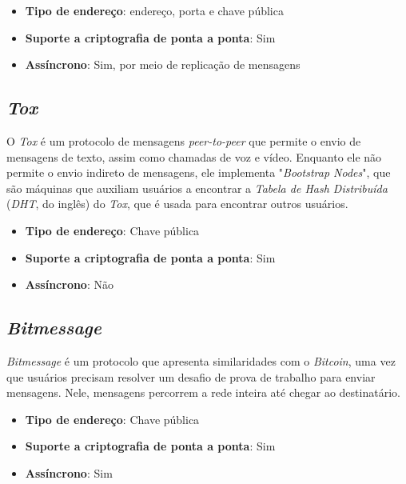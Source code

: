 \begin{itemize}
  \item \textbf{Tipo de endereço}: endereço, porta e chave pública
  \item \textbf{Suporte a criptografia de ponta a ponta}: Sim
  \item \textbf{Assíncrono}: Sim, por meio de replicação de mensagens
\end{itemize}

\subsection{\textit{Tox}}

O \textit{Tox} é um protocolo de mensagens \textit{peer-to-peer} que permite o envio de mensagens de texto, assim como chamadas de voz e vídeo. Enquanto ele não permite o envio indireto de mensagens, ele implementa "\textit{Bootstrap Nodes}", que são máquinas que auxiliam usuários a encontrar a \textit{Tabela de Hash Distribuída} (\textit{DHT}, do inglês) do \textit{Tox}, que é usada para encontrar outros usuários. \cite{toxcore}

\begin{itemize}
  \item \textbf{Tipo de endereço}: Chave pública
  \item \textbf{Suporte a criptografia de ponta a ponta}: Sim
  \item \textbf{Assíncrono}: Não
\end{itemize}

\subsection{\textit{Bitmessage}}

\textit{Bitmessage} é um protocolo que apresenta similaridades com o \textit{Bitcoin}, uma vez que usuários precisam resolver um desafio de prova de trabalho para enviar mensagens. Nele, mensagens percorrem a rede inteira até chegar ao destinatário. \cite{bitmessage}

\begin{itemize}
  \item \textbf{Tipo de endereço}: Chave pública
  \item \textbf{Suporte a criptografia de ponta a ponta}: Sim
  \item \textbf{Assíncrono}: Sim
\end{itemize}